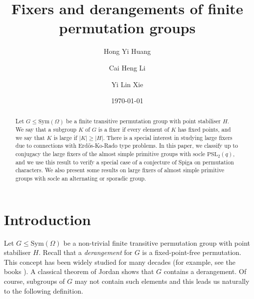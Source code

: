 \documentclass[twoside,a4paper,reqno,11pt]{amsart}
\newcommand{\<}{\langle}
\renewcommand{\>}{\rangle}
\newcommand{\leqs}{\leqslant}
\newcommand{\geqs}{\geqslant}
\newcommand{\PSL}{\mathrm{PSL}}
\def\Sym{\mathrm{Sym}}
\theoremstyle{definition}
\begin{document}
	
	\title[Fixers and derangements of finite permutation groups]{Fixers and derangements of finite permutation groups}
	\author{Hong Yi Huang}
	\address{H.Y. Huang, School of Mathematics, University of Bristol, Bristol BS8 1UG, UK}
	\author{Cai Heng Li}
	\address{C.H. Li, SUSTech International Center for Mathematics, and Department of Mathematics, Southern University of Science and Technology, Shenzhen 518055, Guangdong, P. R. China}
	\author{Yi Lin Xie}
	\address{Y.L. Xie, Department of Mathematics, Southern University of Science and Technology, Shenzhen 518055, Guangdong, P. R. China}
	\date{\today}
	
	
	
	\begin{abstract}
		Let $G\leqs\Sym(\Omega)$ be a finite transitive permutation group with point stabiliser $H$. We say that a subgroup $K$ of $G$ is a fixer if every element of $K$ has fixed points, and we say that $K$ is large if $|K| \geqs |H|$. There is a special interest in studying large fixers due to connections with Erdős-Ko-Rado type problems. 
		In this paper, we classify up to conjugacy the large fixers of the almost simple primitive groups with socle $\PSL_2(q)$, and we use this result to verify a special case of a conjecture of Spiga on permutation characters. We also present some results on large fixers of almost simple primitive groups with socle an alternating or sporadic group.
	\end{abstract}
	
	\maketitle
	
	\section{Introduction}
	
	\label{s:intro}
	
	
	Let $G\leqs\mathrm{Sym}(\Omega)$ be a non-trivial finite transitive permutation group with point stabiliser $H$. Recall that a \textit{derangement} for $G$ is a fixed-point-free permutation. This concept has been widely studied for many decades (for example, see the books \cite{BG_classical,GM_EKR}). A classical theorem of Jordan \cite{J_der} shows that $G$ contains a derangement. Of course, subgroups of $G$ may not contain such elements and this leads us naturally to the following definition.
	
\end{document}
